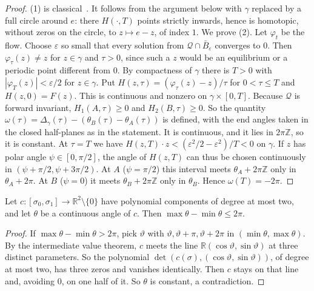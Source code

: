 \documentclass[11pt,a4paper]{report}
\providecommand{\R}{\mathbb{R}}
\newcommand{\Q}{\mathcal{Q}}
\begin{document}
\begin{proof}
(1) is classical~\autocite{KrasnoselskiiZabreiko1984}. It follows from the argument below with \(\gamma\) replaced
by a full circle around \(e\): there \(H(\cdot,T)\) points strictly inwards, hence is homotopic, without zeros on
the circle, to \(z\mapsto e-z\), of index \(1\). We prove (2). Let \(\varphi_t\)
be the flow. Choose \(\varepsilon\) so small that every solution from \(\Q\cap\bar B_\varepsilon\) converges to \(0\).
Then \(\varphi_\tau(z)\neq z\) for \(z\in\gamma\) and \(\tau>0\), since such a \(z\) would be an equilibrium or a
periodic point different from \(0\). By compactness of \(\gamma\) there is \(T>0\) with \(|\varphi_T(z)|<\varepsilon/2\) for
\(z\in\gamma\). Put \(H(z,\tau)=(\varphi_\tau(z)-z)/\tau\) for \(0<\tau\le T\) and \(H(z,0)=F(z)\). This is continuous
and nonzero on \(\gamma\times[0,T]\). Because \(\Q\) is forward invariant, \(H_1(A,\tau)\ge0\) and
\(H_2(B,\tau)\ge0\). So the quantity \(\omega(\tau)=\Delta_\gamma(\tau)-(\theta_B(\tau)-\theta_A(\tau))\) is defined,
with the end angles taken in the closed half-planes as in the statement. It is continuous, and it lies in
\(2\pi\mathbb Z\), so it is constant. At \(\tau=T\) we have \(H(z,T)\cdot z<(\varepsilon^2/2-\varepsilon^2)/T<0\) on
\(\gamma\). If \(z\) has polar angle \(\psi\in[0,\pi/2]\), the angle of \(H(z,T)\) can thus be chosen continuously in
\((\psi+\pi/2,\psi+3\pi/2)\). At \(A\) (\(\psi=\pi/2\)) this interval meets \(\theta_A+2\pi\mathbb Z\) only in
\(\theta_A+2\pi\). At \(B\) (\(\psi=0\)) it meets \(\theta_B+2\pi\mathbb Z\) only in \(\theta_B\). Hence
\(\omega(T)=-2\pi\).
\end{proof}

\begin{lemma}\label{lem:sweep}
Let \(c:[\sigma_0,\sigma_1]\to\R^2\setminus\{0\}\) have polynomial components of degree at most two, and let
\(\theta\) be a continuous angle of \(c\). Then \(\max\theta-\min\theta\le2\pi\).
\end{lemma}

\begin{proof}
If \(\max\theta-\min\theta>2\pi\), pick \(\vartheta\) with \(\vartheta,\vartheta+\pi,\vartheta+2\pi\) in
\((\min\theta,\max\theta)\). By the intermediate value theorem, \(c\) meets the line \(\R(\cos\vartheta,\sin\vartheta)\)
at three distinct parameters. So the polynomial \(\det(c(\sigma),(\cos\vartheta,\sin\vartheta))\), of degree at most
two, has three zeros and vanishes identically. Then \(c\) stays on that line and, avoiding \(0\), on one half of it.
So \(\theta\) is constant, a contradiction.
\end{proof}
\end{document}
